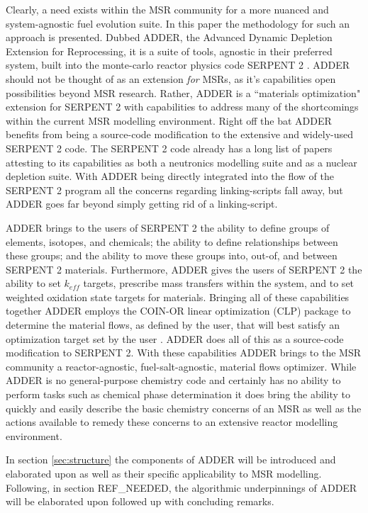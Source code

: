 \documentclass[]{elsarticle}
\begin{document}
Clearly, a need exists within the MSR community for a more nuanced and
system-agnostic fuel evolution suite. In this paper the methodology for such an
approach is presented. Dubbed ADDER, the Advanced Dynamic Depletion
Extension for Reprocessing, it is a suite of tools, agnostic in their
preferred system, built into the monte-carlo reactor physics code SERPENT 2
\cite{leppanen_serpent_nodate}.
ADDER should not be thought of as an extension \textit{for} MSRs, as it's
capabilities open possibilities beyond MSR research. Rather, ADDER is a
``materials optimization" extension for SERPENT 2 with capabilities to address
many of the shortcomings within the current MSR modelling environment. Right off
the bat ADDER benefits from being a source-code modification to the extensive
and widely-used SERPENT 2 code. The SERPENT 2 code already has a long list of
papers attesting to its capabilities as both a neutronics modelling suite and
as a nuclear depletion suite. With ADDER being directly integrated into the
flow of the SERPENT 2 program all the concerns regarding linking-scripts fall
away, but ADDER goes far beyond simply getting rid of a linking-script.

ADDER brings to the users of SERPENT 2 the ability to define groups of elements,
isotopes, and chemicals; the ability to define relationships between these 
groups; and the ability to move these groups into, out-of, and between SERPENT 2
materials. Furthermore, ADDER gives the users of SERPENT 2 the ability to set
$k_{eff}$ targets, prescribe mass transfers within the system, and to set
weighted oxidation state targets for materials. Bringing all of these
capabilities together ADDER employs the COIN-OR linear optimization (CLP) 
package to determine the material flows, as defined by the user, that will best 
satisfy an optimization target set by the user \cite{lougee-heimer_common_2003}.
ADDER does all of this as a source-code
modification to SERPENT 2. With these capabilities ADDER brings to the MSR
community a reactor-agnostic, fuel-salt-agnostic, material flows optimizer.
While ADDER is no general-purpose chemistry code and certainly has no ability
to perform tasks such as chemical phase determination it does bring the ability
to quickly and easily describe the basic chemistry concerns of an MSR as well
as the actions available to remedy these concerns to an extensive reactor
modelling environment. 

In section \ref{sec:structure} the components of ADDER will be introduced and elaborated
upon as well as their specific applicability to MSR modelling. Following, in
section REF\_NEEDED, the algorithmic underpinnings of ADDER will be elaborated
upon followed up with concluding remarks.
\end{document}

